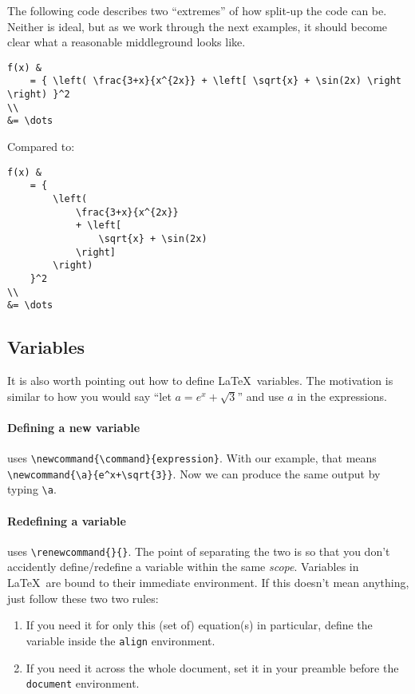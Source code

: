 The following code describes two ``extremes'' of how split-up the code can be.
Neither is ideal, but as we work through the next examples, it should become clear what a reasonable middleground looks like.
\begin{lstlisting}
f(x) &
    = { \left( \frac{3+x}{x^{2x}} + \left[ \sqrt{x} + \sin(2x) \right \right) }^2
\\
&= \dots
\end{lstlisting}
Compared to:
\begin{lstlisting}
f(x) &
    = {
        \left( 
            \frac{3+x}{x^{2x}}
            + \left[ 
                \sqrt{x} + \sin(2x)
            \right]
        \right)
    }^2
\\
&= \dots
\end{lstlisting}

\subsection{Variables}
It is also worth pointing out how to define \LaTeX\ variables.
The motivation is similar to how you would say ``let \(a = e^x+\sqrt{3}\)'' and use \(a\) in the expressions.

\paragraph{Defining a new variable} uses \verb|\newcommand{\command}{expression}|.
With our example, that means \verb|\newcommand{\a}{e^x+\sqrt{3}}|.
Now we can produce the same output by typing \verb|\a|.

\paragraph{Redefining a variable} uses \verb|\renewcommand{}{}|. The point of separating the two is so that you don't accidently define/redefine a variable within the same \emph{scope}.
Variables in \LaTeX\ are bound to their immediate environment.
If this doesn't mean anything, just follow these two two rules:
\begin{enumerate}
    \item If you need it for only this (set of) equation(s) in particular, define the variable inside the \verb|align| environment.
    \item If you need it across the whole document, set it in your preamble before the \texttt{document} environment.
\end{enumerate}


